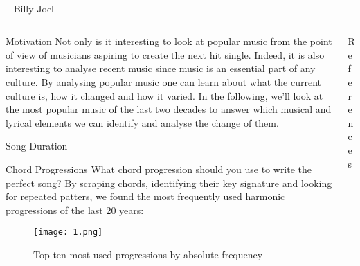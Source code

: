 \begin{frame}[t]
\centering
\textit{}\\ -- Billy Joel
\begin{columns}
\begin{column}{0.49\textwidth}
    \begin{block}{Motivation} 
        Not only is it interesting to look at popular music from the point of view of musicians aspiring to create the next hit single. Indeed, it is also interesting to analyse recent music since music is an essential part of any culture.
        By analysing popular music one can learn about what the current culture is, how it changed and how it varied.
        In the following, we'll look at the most popular music of the last two decades to answer which musical and lyrical elements we can identify and analyse the change of them.
    \end{block}
    \begin{block}{Song Duration}
    \end{block}
    \begin{block}{Chord Progressions}
    What chord progression should you use to write the perfect song? By scraping chords, identifying their key signature and looking for repeated patters, we found the most frequently used harmonic progressions of the last 20 years:
    \begin{figure}[hbt!]
        \centering
        \texttt{[image: 1.png]}
        \caption{Top ten most used progressions by absolute frequency}
    \end{figure}
    \end{block}
    \end{column}
\begin{column}{0.49\textwidth}
    \begin{block}{References}
        \printbibliography
    \end{block}
\end{column}
\end{columns}


\end{frame}


